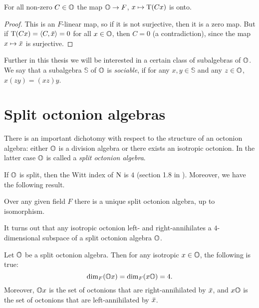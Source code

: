 \begin{lemma}
	For all non-zero $C \in \mathbb{O}$ the map $\mathbb{O} \rightarrow F$, $x \mapsto \operatorname{T}(Cx)$ is onto.
\end{lemma}

\begin{proof}
	This is an $F$-linear map, so if it is not surjective, then it is a zero map. But if 
	$\operatorname{T}(Cx) = \langle C, \mathord{\mbox{\hspace*{0pt}}\,\overline{\!x\!\!\;}\!\:}\mbox{\hspace*{0pt}} \rangle = 0$ for all $x \in \mathbb{O}$, then $C = 0$ (a contradiction), since the
	map $x \mapsto \mathord{\mbox{\hspace*{0pt}}\,\overline{\!x\!\!\;}\!\:}\mbox{\hspace*{0pt}}$ is surjective. 
\end{proof}

Further in this thesis we will be interested in a certain class of subalgebras of $\mathbb{O}$. We say
that a subalgebra $\mathbb{S}$ of $\mathbb{O}$ is \textit{sociable}, if for any $x,y \in \mathbb{S}$
and any $z \in \mathbb{O}$, $x(zy) = (xz)y$. 

\section{Split octonion algebras}

There is an important dichotomy with respect to the structure of an octonion algebra: 
either $\mathbb{O}$ is a division algebra or there exists an isotropic octonion.
In the latter case $\mathbb{O}$ is called a \textit{split octonion algebra}. 

If $\mathbb{O}$ is split, then the Witt index of $\mathord{\mathrm{N}}$ is $4$ (section 1.8 in \cite{SpringerVeldkamp}).
Moreover, we have the following result.
\begin{theorem}
	\label{theorem:unique_split_algebra}
	Over any given field $F$ there is a unique split octonion algebra, up to isomorphism.
\end{theorem}
It turns out that any isotropic octonion left- and right-annihilates a $4$-dimensional subspace
of a split octonion algebra $\mathbb{O}$. 

\begin{proposition}
	\label{prop:octonion_annihilator}
	Let $\mathbb{O}$ be a split octonion algebra. Then for any isotropic $x \in \mathbb{O}$, the 
	following is true:
	\begin{equation}
		\dim_F(\mathbb{O} x) = \dim_F(x\mathbb{O}) = 4. 
	\end{equation}
	Moreover, $\mathbb{O} x$ is the set of octonions that are right-annihilated by $\mathord{\mbox{\hspace*{0pt}}\,\overline{\!x\!\!\;}\!\:}\mbox{\hspace*{0pt}}$, and
	$x \mathbb{O}$ is the set of octonions that are left-annihilated by $\mathord{\mbox{\hspace*{0pt}}\,\overline{\!x\!\!\;}\!\:}\mbox{\hspace*{0pt}}$.
\end{proposition}

